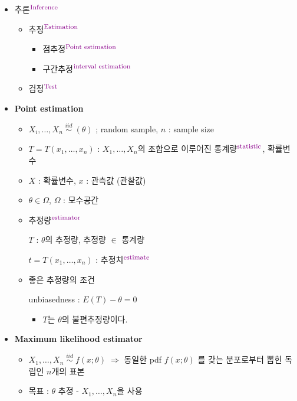 \documentclass{oblivoir}
\newcommand{\DC}[1]{\textcolor{DarkMagenta}{#1}}%
\newcommand{\UP}[1]{$^{\mbox{\DC{\footnotesize #1}}}$}
\begin{document}
\begin{itemize}
\item 추론\UP{Inference}
\begin{itemize}
\item 추정\UP{Estimation}
\begin{itemize}
\item 점추정\UP{Point estimation}
\item 구간추정\UP{interval estimation}
\end{itemize}
\item 검정\UP{Test}
\end{itemize}

\item
\textbf{Point estimation}
\begin{itemize}
\item
 $X_i, \ldots, X_n \;\overset{iid}{\sim}\; (\theta)$ ; random sample, $n$ : sample size

\item
$T = T(x_1, \ldots, x_n)$ : $X_1, \ldots, X_n$의 조합으로 이루어진 통계량\UP{statistic}, 확률변수 

\item
$X$ : 확률변수, $x$ : 관측값 (관찰값)

\item 
$\theta \in \Omega$, $\Omega$ : 모수공간

\item 
추정량\UP{estimator}

$T$ : $\theta$의 추정량, 추정량 $\in$ 통계량

$t = T(x_1, \ldots, x_n)$ : 추정치\UP{estimate}

\item
좋은 추정량의 조건

unbiasedness : $E(T) - \theta = 0$
\begin{itemize}
\item $T$는 $\theta$의 불편추정량이다.
\end{itemize}
\end{itemize}

\item 
\textbf{Maximum likelihood estimator}
\begin{itemize}
\item 
$X_1, \ldots, X_n \;\overset{iid}{\sim}\; f(x;\theta)\; \Rightarrow$ 동일한 pdf $f(x;\theta)$ 를 갖는 분포로부터 뽑힌 독립인 $n$개의 표본

\item 
목표 : $\theta$ 추정 - $X_1, \ldots, X_n$을 사용


\end{itemize}
\end{itemize}
\end{document}
